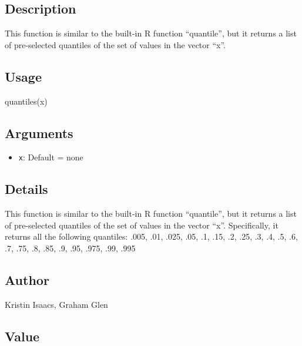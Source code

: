 \documentclass[
]{article}
\newenvironment{Shaded}{\begin{snugshade}}{\end{snugshade}}
\newcommand{\FunctionTok}[1]{\textcolor[rgb]{0.00,0.00,0.00}{#1}}
\newcommand{\NormalTok}[1]{#1}
\providecommand{\tightlist}{%
  \setlength{\itemsep}{0pt}\setlength{\parskip}{0pt}}
\begin{document}
\hypertarget{description-34}{%
\subsection{Description}\label{description-34}}

This function is similar to the built-in R function ``quantile'', but it
returns a list of pre-selected quantiles of the set of values in the
vector ``x''.

\hypertarget{usage-34}{%
\subsection{Usage}\label{usage-34}}

\begin{Shaded}
\begin{Highlighting}[]
\FunctionTok{quantiles}\NormalTok{(x)}
\end{Highlighting}
\end{Shaded}

\hypertarget{arguments-31}{%
\subsection{Arguments}\label{arguments-31}}

\begin{itemize}
\tightlist
\item
  \texttt{x}: Default = none
\end{itemize}

\hypertarget{details-24}{%
\subsection{Details}\label{details-24}}

This function is similar to the built-in R function ``quantile'', but it
returns a list of pre-selected quantiles of the set of values in the
vector ``x''. Specifically, it returns all the following quantiles:
.005, .01, .025, .05, .1, .15, .2, .25, .3, .4, .5, .6, .7, .75, .8,
.85, .9, .95, .975, .99, .995

\hypertarget{author-26}{%
\subsection{Author}\label{author-26}}

Kristin Isaacs, Graham Glen

\hypertarget{value-29}{%
\subsection{Value}\label{value-29}}
\end{document}
